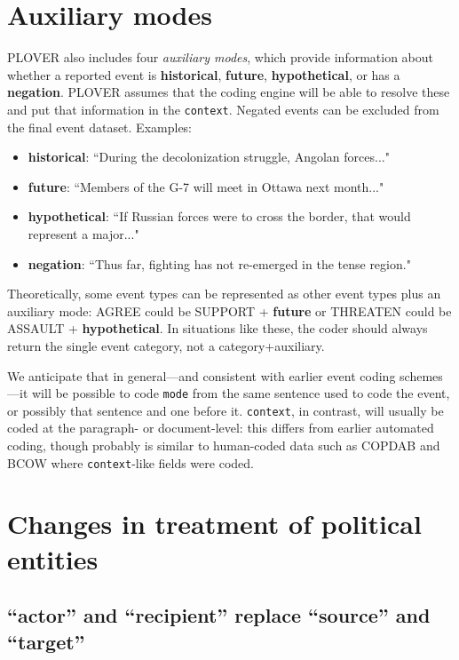 \documentclass[11pt]{report}
\newcommand{\plcat}[1]{\textsf{#1}}
\newcommand{\plcon}[1]{\textbf{#1}}
\newcommand{\txt}[1]{\texttt{#1}}
\begin{document}
\newpage

\section{Auxiliary modes}\label{ssec:special}

PLOVER also includes four \emph{auxiliary modes}, which provide information about whether a reported event is \plcon{historical}, \plcon{future}, \plcon{hypothetical}, or has a \plcon{negation}. PLOVER assumes that the coding engine will be able to resolve these and put that information in the \txt{context}. Negated events can be excluded from the final event dataset. Examples:
   \begin{itemize}
   \item \plcon{historical}: ``During the decolonization struggle, Angolan forces..."
   \item \plcon{future}: ``Members of the G-7 will meet in Ottawa next month..."
   \item \plcon{hypothetical}: ``If Russian forces were to cross the border, that would represent a major..."
   \item \plcon{negation}: ``Thus far, fighting has not re-emerged in the tense region."	
   \end{itemize}

Theoretically, some event types can be represented as other event types plus an auxiliary mode: \plcat{AGREE} could be  \plcat{SUPPORT} + \plcon{future} or \plcat{THREATEN} could be \plcat{ASSAULT} + \plcon{hypothetical}. In situations like these, the coder should always return the single event category, not a category+auxiliary.

We anticipate that in general---and consistent with earlier event coding schemes---it will be possible to code \txt{mode} from the same sentence used to code the event, or possibly that sentence and one before it. \txt{context}, in contrast, will usually be coded at the paragraph- or document-level: this differs from earlier automated coding, though probably is similar to human-coded data such as COPDAB and BCOW \citep{Leng87} where \txt{context}-like fields were coded.


\section{Changes in treatment of political entities}\label{ssec:change}

\subsection{``actor'' and ``recipient'' replace ``source'' and ``target''}
\end{document}
